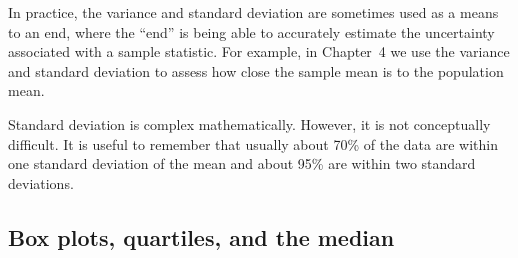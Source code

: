 
In practice, the variance and standard deviation are sometimes used as a means to an end, where the ``end'' is being able to accurately estimate the uncertainty associated with a sample statistic. For example, in Chapter~4 %
we use the variance and standard deviation to assess how close the sample mean is to the population mean.

\begin{tipBox}{
Standard deviation is complex mathematically. However, it is not conceptually difficult. %
It is useful to remember that usually about 70\% of the data are within one standard deviation of the mean and about 95\% are within two standard deviations.}
\end{tipBox}



\subsection{Box plots, quartiles, and the median}

